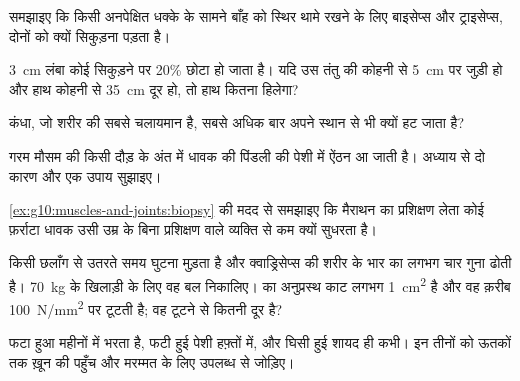 \begin{exercise}[$\star\star$]\label{exo:g10:muscles-and-joints:7}
समझाइए कि किसी अनपेक्षित धक्के के सामने बाँह को स्थिर थामे रखने के लिए
बाइसेप्स और ट्राइसेप्स, दोनों को क्यों सिकुड़ना पड़ता है।
\end{exercise}

\begin{exercise}[$\star\star$]\label{exo:g10:muscles-and-joints:8}
\qty{3}{cm} लंबा कोई  सिकुड़ने पर 20\% छोटा हो जाता है। यदि उस
तंतु की  कोहनी से \qty{5}{cm} पर जुड़ी हो और हाथ कोहनी से
\qty{35}{cm} दूर हो, तो हाथ कितना हिलेगा?
\end{exercise}

\begin{exercise}[$\star\star$]\label{exo:g10:muscles-and-joints:9}
कंधा, जो शरीर की सबसे चलायमान  है, सबसे अधिक बार अपने स्थान से भी
क्यों हट जाता है?
\end{exercise}

\begin{exercise}[$\star\star$]\label{exo:g10:muscles-and-joints:10}
गरम मौसम की किसी दौड़ के अंत में धावक की पिंडली की पेशी में ऐंठन आ जाती
है। अध्याय से दो कारण और एक उपाय सुझाइए।
\end{exercise}

\begin{exercise}[$\star\star$]\label{exo:g10:muscles-and-joints:11}
\cref{ex:g10:muscles-and-joints:biopsy} की मदद से समझाइए कि मैराथन का
प्रशिक्षण लेता कोई फ़र्राटा धावक उसी उम्र के बिना प्रशिक्षण वाले
व्यक्ति से कम क्यों सुधरता है।
\end{exercise}

\begin{exercise}[$\star\star\star$]\label{exo:g10:muscles-and-joints:12}
किसी छलाँग से उतरते समय घुटना मुड़ता है और क्वाड्रिसेप्स की  शरीर के
भार का लगभग चार गुना ढोती है। \qty{70}{kg} के खिलाड़ी के लिए वह बल
निकालिए।  का अनुप्रस्थ काट लगभग \qty{1}{cm^2} है और वह क़रीब
\qty{100}{N/mm^2} पर टूटती है; वह टूटने से कितनी दूर है?
\end{exercise}

\begin{exercise}[$\star\star\star$]\label{exo:g10:muscles-and-joints:13}
फटा हुआ  महीनों में भरता है, फटी हुई पेशी हफ़्तों में, और घिसी हुई
 शायद ही कभी। इन तीनों को ऊतकों तक ख़ून की पहुँच और मरम्मत के लिए
उपलब्ध  से जोड़िए।
\end{exercise}

